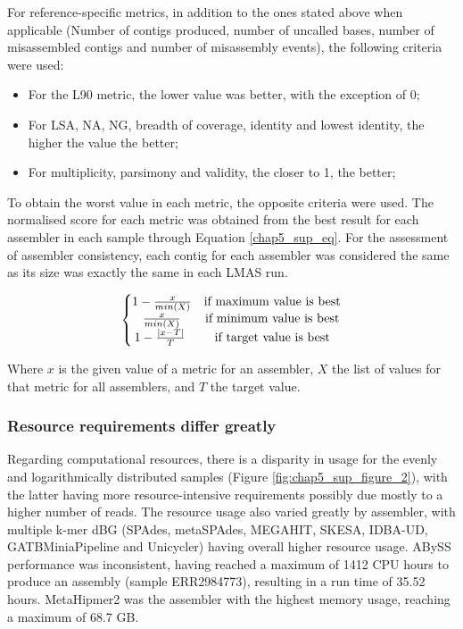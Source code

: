 For reference-specific metrics, in addition to the ones stated above when applicable (Number of contigs produced, number of uncalled bases, number of misassembled contigs and number of misassembly events), the following criteria were used:

\begin{itemize}
    \item For the L90 metric, the lower value was better, with the exception of 0;
    \item For LSA, NA, NG, breadth of coverage, identity and lowest identity, the higher the value the better;
    \item For multiplicity, parsimony and validity, the closer to 1, the better;
\end{itemize}
 
To obtain the worst value in each metric, the opposite criteria were used. The normalised score for each metric was obtained from the best result for each assembler in each sample through Equation \ref{chap5_sup_eq}. For the assessment of assembler consistency, each contig for each assembler was considered the same as its size was exactly the same in each LMAS run. 

\begin{equation} \label{chap5_sup_eq}
\left\{\begin{matrix}
1 - \frac{x}{min(X)} & \textup{if maximum value is best}\\ 
\frac{x}{min(X)} & \textup{if minimum value is best}\\ 
1 - \frac{|x - T|}{T}\ & \textup{if target value is best}  
\end{matrix}\right.
\end{equation}

Where $x$ is the given value of a metric for an assembler, $X$ the list of values for that metric for all assemblers, and $T$ the target value.

\subsubsection{Resource requirements differ greatly} \label{ch5_sup_resources}

Regarding computational resources, there is a disparity in usage for the evenly and logarithmically distributed samples (Figure \ref{fig:chap5_sup_figure_2}), with the latter having more resource-intensive requirements possibly due mostly to a higher number of reads. The resource usage also varied greatly by assembler, with multiple k-mer dBG (SPAdes, metaSPAdes, MEGAHIT, SKESA, IDBA-UD, GATBMiniaPipeline and Unicycler) having overall higher resource usage. ABySS performance was inconsistent, having reached a maximum of 1412 CPU hours to produce an assembly (sample ERR2984773), resulting in a run time of 35.52 hours.  MetaHipmer2 was the assembler with the highest memory usage, reaching a maximum of 68.7 GB.  

